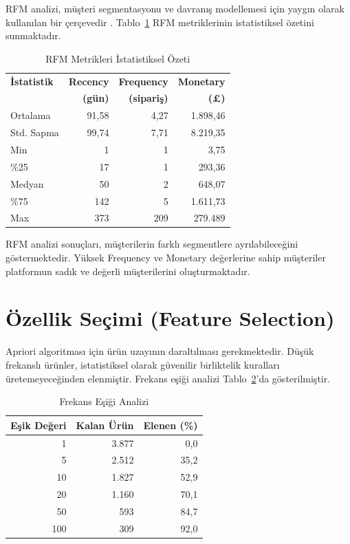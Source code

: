 \documentclass[conference]{IEEEtran}
\begin{document}
RFM analizi, müşteri segmentasyonu ve davranış modellemesi için yaygın olarak kullanılan bir çerçevedir \cite{chen2012}. Tablo~\ref{tab:rfm} RFM metriklerinin istatistiksel özetini sunmaktadır.

\begin{table}[h]
\centering
\caption{RFM Metrikleri İstatistiksel Özeti}
\label{tab:rfm}
\begin{tabular}{lrrr}
\toprule
\textbf{İstatistik} & \textbf{Recency} & \textbf{Frequency} & \textbf{Monetary} \\
 & \textbf{(gün)} & \textbf{(sipariş)} & \textbf{(£)} \\
\midrule
Ortalama & 91,58 & 4,27 & 1.898,46 \\
Std. Sapma & 99,74 & 7,71 & 8.219,35 \\
Min & 1 & 1 & 3,75 \\
\%25 & 17 & 1 & 293,36 \\
Medyan & 50 & 2 & 648,07 \\
\%75 & 142 & 5 & 1.611,73 \\
Max & 373 & 209 & 279.489 \\
\bottomrule
\end{tabular}
\end{table}

RFM analizi sonuçları, müşterilerin farklı segmentlere ayrılabileceğini göstermektedir. Yüksek Frequency ve Monetary değerlerine sahip müşteriler platformun sadık ve değerli müşterilerini oluşturmaktadır.

\section{Özellik Seçimi (Feature Selection)}

Apriori algoritması için ürün uzayının daraltılması gerekmektedir. Düşük frekanslı ürünler, istatistiksel olarak güvenilir birliktelik kuralları üretemeyeceğinden elenmiştir. Frekans eşiği analizi Tablo~\ref{tab:threshold}'da gösterilmiştir.

\begin{table}[h]
\centering
\caption{Frekans Eşiği Analizi}
\label{tab:threshold}
\begin{tabular}{rrr}
\toprule
\textbf{Eşik Değeri} & \textbf{Kalan Ürün} & \textbf{Elenen (\%)} \\
\midrule
1 & 3.877 & 0,0 \\
5 & 2.512 & 35,2 \\
10 & 1.827 & 52,9 \\
20 & 1.160 & 70,1 \\
50 & 593 & 84,7 \\
100 & 309 & 92,0 \\
\bottomrule
\end{tabular}
\end{table}
\end{document}
